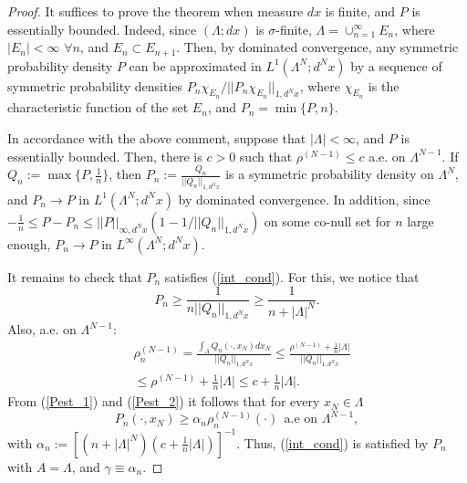 \documentclass[12pt,leqno]{amsart}
\numberwithin{equation}{section}
\numberwithin{theor}{section}
\numberwithin{rem}{section}
\begin{document}
\begin{proof}
It suffices to prove the theorem when measure $dx$ is finite, and $P$ is essentially bounded. Indeed, since $(\Lambda; dx)$ is $\sigma$-finite, $\Lambda=\cup_{n=1}^{\infty} E_n$, where $|E_n|<\infty$ $\forall n$, and $E_{n}\subset E_{n+1}$.  Then, by dominated convergence, any symmetric probability density $P$ can be approximated in 
$L^{1}(\Lambda^N; d^{N}x)$ by a sequence of 
symmetric probability densities $P_n\chi_{E_n}/|| P_n\chi_{E_n}||_{1,d^{N}x}$, where $\chi_{E_n}$ is the characteristic 
function of the set $E_n$, and $P_n=\min\{P,n\}$.  

In accordance with the above comment, suppose that 
$|\Lambda|<\infty$, and $P$ is essentially bounded. 
Then, there is $c>0$ such that $\rho^{(N-1)}\leq c $ a.e. on 
$\Lambda^{N-1}$.  
If $Q_n:=\max\{P,\frac{1}{n} \}$, then $P_n:=\frac{Q_n}{|| Q_n ||_{1,d^{N}x}} $ is a symmetric probability density on 
$\Lambda^N$, and $P_n\rightarrow P$ in $L^{1}(\Lambda^N; d^{N}x)$ by dominated convergence.  In addition, since $-\frac{1}{n}\leq  P-P_n 
\leq || P ||_{\infty, d^{N}x}\left(1 -1\slash || Q_n ||_{1,d^{N}x}\right )$ on some co-null set for $n$ large enough, $P_n\rightarrow P$ in $L^{\infty}(\Lambda^N; d^{N}x)$.  

It remains to check that $P_n$ satisfies (\ref{int_cond}).  For this, we notice that 
\begin{equation}
\label{Pest_1}
P_n\geq \frac{1}{n || Q_n ||_{1,d^{N}x}} \geq 
\frac{1}{n + |\Lambda|^{N} }.
\end{equation}
Also, a.e. on $\Lambda^{N-1}$:
\begin{equation}
\label{Pest_2}
\begin{split}
&\rho_n^{(N-1)}= 
\frac{\int_{\Lambda} Q_n (\cdot,x_N)dx_N}{|| Q_n ||_{1,d^{N}x}}\leq 
\frac{\rho^{(N-1)} + \frac{1}{n} |\Lambda|}{|| Q_n ||_{1,d^{N}x}} \\
&\leq \rho^{(N-1)} + \frac{1}{n} |\Lambda| 
\leq c+ \frac{1}{n} |\Lambda|.
\end{split}
\end{equation}
From (\ref{Pest_1}) and (\ref{Pest_2}) it follows that 
for every $x_N\in \Lambda$
\begin{equation}
P_n(\cdot,x_N)\geq \alpha_n \rho_n^{(N-1)}(\cdot)~~ \text{
a.e on $\Lambda^{N-1}$},
\end{equation}
with $\alpha_n:=\left [ \left (n+ |\Lambda|^N\right )\left (c+\frac{1}{n} 
|\Lambda | \right )\right ]^{-1}$.  
Thus, (\ref{int_cond}) is satisfied by $P_n$ with 
$A=\Lambda$, and $\gamma\equiv \alpha_n$.
\end{proof}
\end{document}
